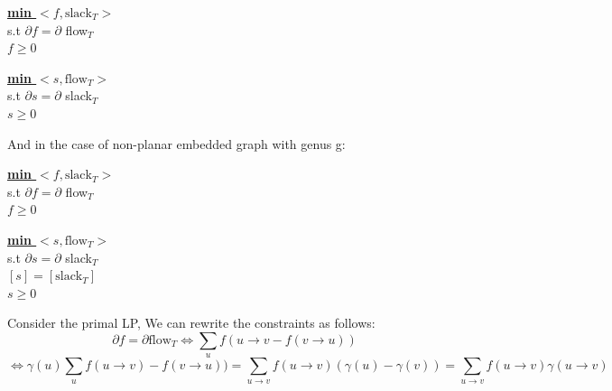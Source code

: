 \documentclass{article}
\begin{document}
\begin{minipage}[t]{0.48\linewidth}
\begin{center}
\begin{algorithm}
\textbf{\underline{min $<f, \text{slack}_{T}>$}} \\
  s.t  $\partial f =\partial $  flow$_T$ \\ \qquad
       $f \geq 0$
\end{algorithm}
\end{center}
\end{minipage}
\hfill
\begin{minipage}[t]{0.48\linewidth}
\begin{algorithm}
\textbf{\underline{min $<s, \text{flow}_{T}>$}} \\
  s.t  $\partial s = \partial $ slack$_T$ \\ \qquad
       $s \geq 0$
\end{algorithm}
\end{minipage}


And in the case of non-planar embedded graph with genus g:

\begin{minipage}[t]{0.48\linewidth}
\begin{center}
\begin{algorithm}
\textbf{\underline{min $<f, \text{slack}_{T}>$}} \\
  s.t  $\partial f =\partial $  flow$_T$ \\ \qquad
       $f \geq 0$
\end{algorithm}
\end{center}
\end{minipage}
\hfill
\begin{minipage}[t]{0.48\linewidth}
\begin{algorithm}
\textbf{\underline{min $<s, \text{flow}_{T}>$}} \\
  s.t  $\partial s = \partial $ slack$_T$ \\ \qquad
       $[s] = [\text{slack}_T]$ \\ \qquad
       $s \geq 0$
\end{algorithm}
\end{minipage}

Consider the primal LP, We can rewrite the constraints as follows:
\[ \partial f = \partial \text{flow}_T \Longleftrightarrow \sum \limits_u f(u \rightarrow v - f(v \rightarrow u)) \]
\[ \Longleftrightarrow \gamma (u)\sum_u f(u \rightarrow v) - f(v \rightarrow u)) = \sum \limits_{u \rightarrow v} f(u \rightarrow v) (\gamma (u) - \gamma (v)) = \sum \limits_{u \rightarrow v} f(u \rightarrow v) \gamma (u \rightarrow v)\]
\end{document}
